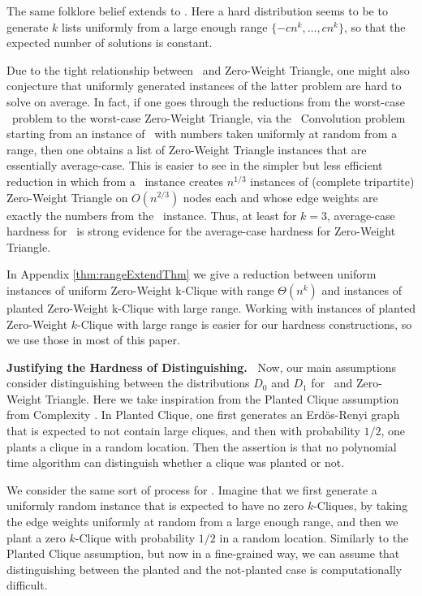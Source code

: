 The same folklore belief extends to \kSum. Here a hard distribution seems to be to generate $k$ lists uniformly from a large enough range $\{-cn^k,\ldots, cn^k\}$, so that the expected number of solutions is constant. 

Due to the tight relationship between \ThSum~and Zero-Weight Triangle, one might also conjecture that uniformly generated instances of the latter problem are hard to solve on average. In fact, if one goes through the reductions from the worst-case \ThSum~problem to the worst-case Zero-Weight Triangle, via the \ThSum~Convolution problem \cite{Patrascu10,WilliamsW13j} starting from an instance of \ThSum~with numbers taken uniformly at random from a range, then one obtains a list of Zero-Weight Triangle instances that are essentially average-case. This is easier to see in the simpler but less efficient reduction in \cite{WilliamsW13j} which from a \ThSum~instance creates $n^{1/3}$ instances of (complete tripartite) Zero-Weight Triangle on $O(n^{2/3})$ nodes each and whose edge weights are exactly the numbers from the \ThSum~instance. Thus, at least for $k=3$, average-case hardness for \ThSum~is strong evidence for the average-case hardness for Zero-Weight Triangle.

In Appendix \ref{thm:rangeExtendThm} we give a reduction between uniform instances of uniform Zero-Weight k-Clique with range $\Theta(n^k)$ and instances of planted Zero-Weight k-Clique with large range. Working with instances of planted Zero-Weight $k$-Clique with large range is easier for our hardness constructions, so we use those in most of this paper.  

\textbf{Justifying the Hardness of Distinguishing.~}
Now, our main assumptions consider distinguishing between the distributions $D_0$ and $D_1$ for
\ThSum~and Zero-Weight Triangle. Here we take inspiration from the Planted Clique assumption from Complexity \cite{HazanK11,Jerrum92,Kucera95}. In Planted Clique, one first generates an Erd\"os-Renyi graph that is expected to not contain large cliques, and then with probability $1/2$, one plants a clique in a random location. Then the assertion is that no polynomial time algorithm can distinguish whether a clique was planted or not.

We consider the same sort of process for \zkclique. Imagine that we first generate a uniformly random instance that is expected to have no zero $k$-Cliques, by taking the edge weights uniformly at random from a large enough range, and then we plant a zero $k$-Clique with probability $1/2$ in a random location. Similarly to the Planted Clique assumption, but now in a fine-grained way, we can assume that distinguishing between the planted and the not-planted case is computationally difficult.

